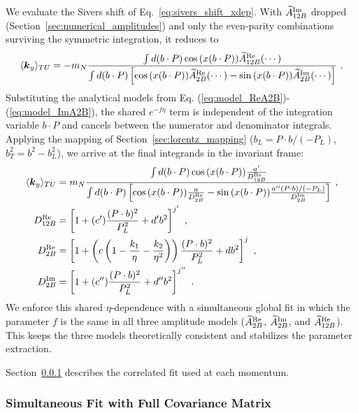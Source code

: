 We evaluate the Sivers shift of Eq.~\eqref{eq:sivers_shift_xdep}. With $\widetilde{A}_{12B}^{\text{Im}}$ dropped (Section~\ref{sec:numerical_amplitudes}) and only the even-parity combinations surviving the symmetric integration, it reduces to
\begin{equation}
    \langle \boldsymbol{k}_y \rangle_{TU} = -m_{N} \frac{\int d(b\cdot P) \cos{\left(x(b\cdot P)\right)}\widetilde{A}_{12B}^{\text{Re}}(\cdots)}{\int d(b\cdot P)\left[\cos{\left(x(b\cdot P)\right)}\widetilde{A}_{2B}^{\text{Re}}(\cdots)-\sin{\left(x(b\cdot P)\right)}\widetilde{A}_{2B}^{\text{Im}}(\cdots)\right]} \ .
\end{equation}
Substituting the analytical models from Eq. (\ref{eq:model_ReA2B})-(\ref{eq:model_ImA2B}), the shared $e^{-f\eta}$ term is independent of the integration variable $b\cdot P$ and cancels between the numerator and denominator integrals. Applying the mapping of Section~\ref{sec:lorentz_mapping} ($b_L=P\cdot b/(-P_L)$, $b_T^2=b^2-b_L^2$), we arrive at the final integrands in the invariant frame:
\begin{equation}
\begin{aligned}
    \langle \boldsymbol{k}_y \rangle_{TU} &= m_{N} \frac{\int d(b\cdot P) \cos{\left(x(b\cdot P)\right)} \frac{a^{\prime}}{D_{12B}^{\text{Re}}}}{\int d(b\cdot P)\left[\cos{\left(x(b\cdot P)\right)} \frac{a}{D_{2B}^{\text{Re}}} - \sin{\left(x(b\cdot P)\right)}\frac{a^{\prime\prime} (P \cdot b) / (-P_L)}{D_{2B}^{\text{Im}}}\right]} \ , \\
    D_{12B}^{\text{Re}} &= \left[1 + (c^{\prime}) \frac{(P \cdot b)^2}{P_L^2} + d^{\prime} b^2\right]^{j^{\prime}} \ , \\
    D_{2B}^{\text{Re}} &= \left[1 + \left(c\left(1 - \frac{k_1}{\eta} - \frac{k_2}{\eta^2}\right)\right) \frac{(P \cdot b)^2}{P_L^2} + d b^2\right]^j \ , \\
    D_{2B}^{\text{Im}} &= \left[1 + (c^{\prime\prime}) \frac{(P \cdot b)^2}{P_L^2} + d^{\prime\prime} b^2\right]^{j^{\prime\prime}} \ .
\end{aligned}
\end{equation}
We enforce this shared $\eta$-dependence with a simultaneous global fit in which the parameter $f$ is the same in all three amplitude models ($\widetilde{A}_{2B}^{\text{Re}}$, $\widetilde{A}_{2B}^{\text{Im}}$, and $\widetilde{A}_{12B}^{\text{Re}}$). This keeps the three models theoretically consistent and stabilizes the parameter extraction.

Section~\ref{sec:cov_fit} describes the correlated fit used at each momentum.

\subsubsection{Simultaneous Fit with Full Covariance Matrix}
\label{sec:cov_fit}

